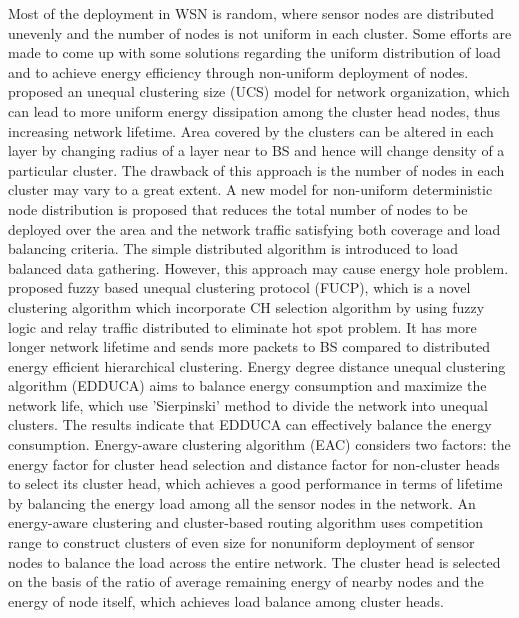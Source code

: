 \documentclass[11pt]{report}
\begin{document}
	
	\noindent Most of the deployment in WSN is random, where sensor nodes are distributed unevenly and the number of nodes is not uniform in each cluster. Some efforts are made to come up with some solutions regarding the uniform distribution of load and to achieve energy efficiency through non-uniform deployment of nodes.
	\cite{1420160} proposed an unequal clustering size (UCS) model for network organization, which can lead to more uniform energy dissipation among the cluster head nodes, thus increasing network lifetime. Area covered by the clusters can be altered in each layer by changing radius of a layer near to BS and hence will change density of a particular cluster. The drawback of this approach is the number of nodes in each cluster may vary to a great extent.
	 A new model for non-uniform deterministic node distribution is proposed \cite{6785530} that reduces the total number of nodes to be deployed over the area and the network traffic satisfying both coverage and load balancing criteria. The simple distributed algorithm is introduced to load balanced data gathering. However, this approach may cause energy hole problem. \cite{7489086} proposed fuzzy based unequal clustering protocol (FUCP), which is a novel clustering algorithm which incorporate CH selection algorithm by using fuzzy logic and relay traffic distributed to eliminate hot spot problem. It has more longer network lifetime and sends more packets to BS compared to distributed energy efficient hierarchical clustering. Energy degree distance unequal clustering algorithm (EDDUCA)\cite{Guiloufi2016} aims to balance energy consumption and maximize the network life, which use 'Sierpinski' method to divide the network into unequal clusters. The results indicate that EDDUCA can effectively balance the energy consumption. Energy-aware clustering algorithm (EAC) \cite{6602412} considers two factors: the energy factor for cluster head selection and distance factor for non-cluster heads to select its cluster head, which achieves a good performance in terms of lifetime by balancing the energy load among all the sensor nodes in the network. An energy-aware clustering and cluster-based routing algorithm \cite{YU201254} uses competition range to construct clusters of even size for nonuniform deployment of sensor nodes to balance the load across the entire network. The cluster head is selected on the basis of the ratio of average remaining energy of nearby nodes and the energy of node itself, which achieves load balance among cluster heads. 
	
	 
\end{document}
